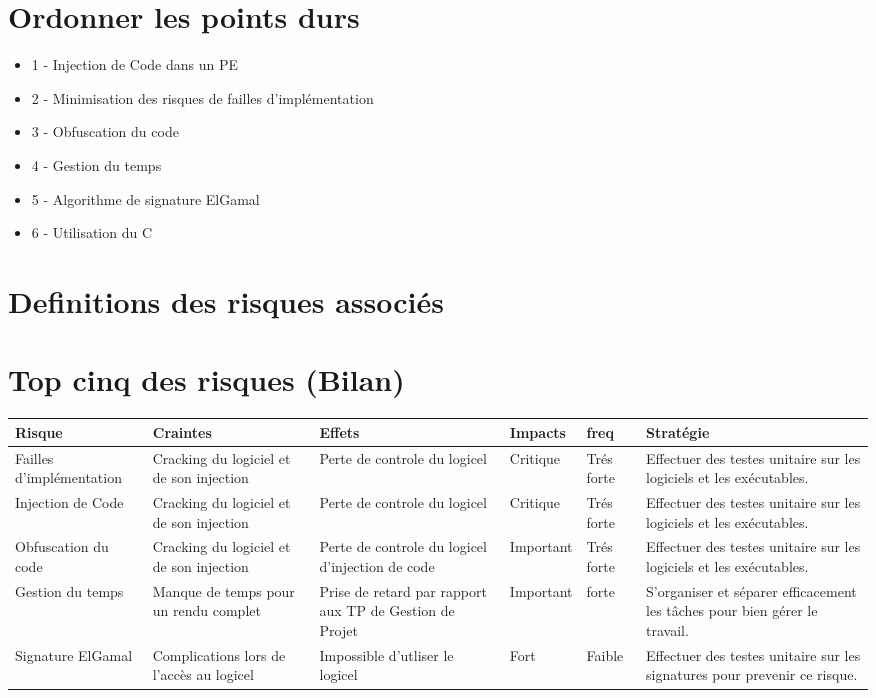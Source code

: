 \chapter{Ordonner les points durs}
\begin{itemize}
	\item 1 - Injection de Code dans un PE
	\item 2 - Minimisation des risques de failles d'implémentation
	\item 3 - Obfuscation du code
	\item 4 - Gestion du temps
	\item 5 - Algorithme de signature ElGamal
	\item 6 - Utilisation du C
\end{itemize}

\chapter{Definitions des risques associés}

\chapter{Top cinq des risques (Bilan)}

\begin{table}[!h]
    \small
    \begin{tabular}{|m{2.5cm}|m{2.5cm}|m{2.5cm}|m{1.5cm}|m{1.5cm}|m{4cm}|} 
	\hline
	\textbf{Risque} & \textbf{Craintes} & \textbf{Effets} & \textbf{Impacts} & \textbf{freq} & \textbf{Stratégie}\\
	\hline
	Failles d'implémentation & Cracking du logiciel et de son injection &  Perte de controle du logicel & Critique & Trés forte & Effectuer des testes unitaire sur les logiciels et les exécutables.\\
	\hline
	Injection de Code & Cracking du logiciel et de son injection &  Perte de controle du logicel & Critique & Trés forte & Effectuer des testes unitaire sur les logiciels et les exécutables.\\
	\hline
	Obfuscation du code & Cracking du logiciel et de son injection &  Perte de controle du logicel d'injection de code & Important & Trés forte & Effectuer des testes unitaire sur les logiciels et les exécutables.\\
	\hline
	Gestion du temps & Manque de temps pour un rendu complet &  Prise de retard par rapport aux TP de Gestion de Projet & Important & forte & S’organiser et séparer efficacement les tâches pour bien gérer le travail.\\
	\hline
	Signature ElGamal & Complications lors de l'accès au logicel &  Impossible d'utliser le logicel & Fort & Faible & Effectuer des testes unitaire sur les signatures pour prevenir ce risque.\\
	\hline	    
    \end{tabular}
\end{table}

